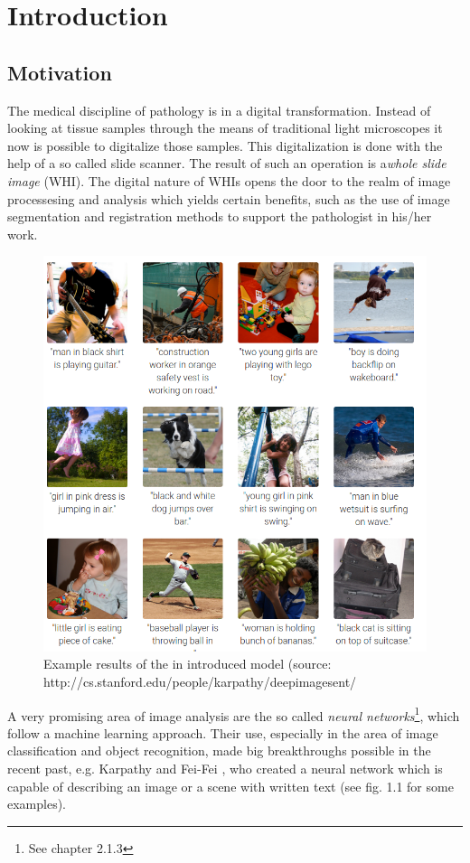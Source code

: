 \chapter{Introduction}

\section{Motivation}
The medical discipline of pathology is in a digital transformation. Instead of looking at tissue samples through the means of traditional light microscopes it now is possible to digitalize those samples. This digitalization is done with the help of a so called slide scanner. The result of such an operation is a\emph{whole slide image} (WHI)\cite{Cornish13}. The digital nature of WHIs opens the door to the realm of image processesing and analysis which yields certain benefits, such as the use of image segmentation and registration methods to support the pathologist in his/her work.
\begin{figure}[ht]
	\begin{center}
		\includegraphics[scale=0.3]{img/deepVisual.png}
		\caption{Example results of the in \cite{Karpathy15} introduced model (source: http://cs.stanford.edu/people/karpathy/deepimagesent/}
		\label{fig:fig1.1}
	\end{center}
\end{figure}
A very promising area of image analysis are the so called \emph{neural networks}\footnote{See chapter 2.1.3}, which follow a machine learning approach. Their use, especially in the area of image classification and object recognition, made big breakthroughs possible in the recent past, e.g. Karpathy and Fei-Fei \cite{Karpathy15}, who created a neural network which is capable of describing an image or a scene with written text (see fig. 1.1 for some examples).

